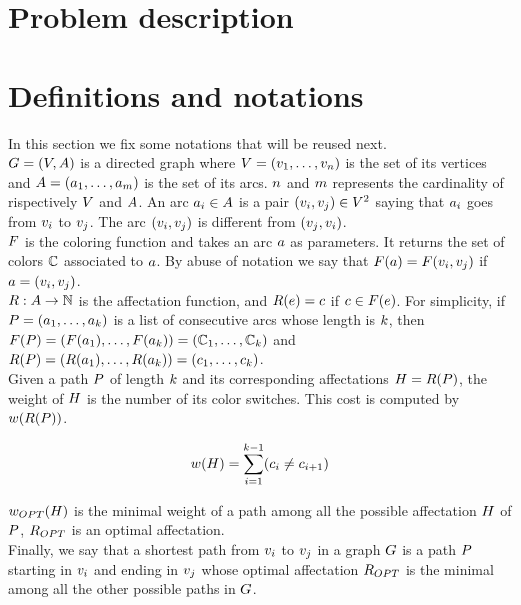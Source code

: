 \section{Problem description}

\section{Definitions and notations}

In this section we fix some notations that will be reused next.\\
$G = (V, A)$ is a directed graph where $V = (v_1,\ldots,v_{n})$ is the set of its vertices and $A = (a_1,\ldots,a_{m})$ is the set of its arcs. $n$ and $m$ represents the cardinality of rispectively $V$ and $A$. An arc $a_i \in A$ is a pair $(v_i, v_j) \in V^2$ saying that $a_i$ goes from $v_i$ to $v_j$. The arc $(v_i, v_j)$ is different from $(v_j, v_i)$.\\
$F$ is the coloring function and takes an arc $a$ as parameters. It returns the set of colors $\mathbb{C}$ associated to $a$. By abuse of notation we say that $F(a) = F(v_i, v_j)$ if $a = (v_i, v_j)$.\\
$R: A \rightarrow \mathbb{N} $ is the affectation function, and $R(e) = c$ if $c \in F(e)$. For simplicity, if $P = (a_1,\ldots,a_{k})$ is a list of consecutive arcs whose length is $k$, then $F(P) = (F(a_1), \dots, F(a_k)) = (\mathbb{C}_1,\ldots,\mathbb{C}_{k})$ and $R(P) = (R(a_1), \dots, R(a_k))  = (c_1,\ldots,c_{k})$.\\
Given a path $P$ of length $k$ and its corresponding affectations $H = R(P)$, the weight of $H$ is the number of its color switches. This cost is computed by $w(R(P))$.

$$ w(H) = \sum\limits_{i = 1}^{k-1} (c_i \neq c_{i+1}) $$

$w_{OPT}(H)$ is the minimal weight of a path among all the possible affectation $H$ of $P$, $R_{OPT}$ is an optimal affectation.\\
Finally, we say that a shortest path from $v_i$ to $v_j$ in a graph $G$ is a path $P$ starting in $v_i$ and ending in $v_j$ whose optimal affectation $R_{OPT}$ is the minimal among all the other possible paths in $G$.